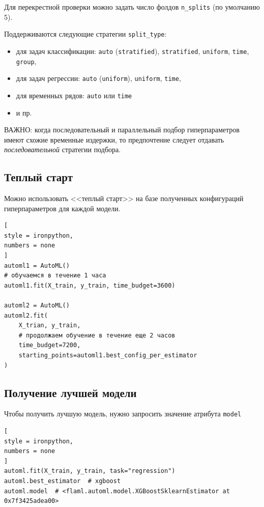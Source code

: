 \documentclass[%
	11pt,
	a4paper,
	utf8,
		]{article}
\begin{document}
Для перекрестной проверки можно задать число фолдов \verb|n_splits| (по умолчанию 5).

Поддерживаются следующие стратегии \verb|split_type|:
\begin{itemize}
	\item для задач классификации: \verb|auto| (\verb|stratified|), \verb|stratified|, \verb|uniform|, \verb|time|, \verb|group|,
	
	\item для задач регрессии: \verb|auto| (\verb|uniform|), \verb|uniform|, \verb|time|,
	
	\item для временных рядов: \verb|auto| или \verb|time|
	
	\item и пр.
\end{itemize}

ВАЖНО: когда последовательный и параллельный подбор гиперпараметров имеют схожие временные издержки, то предпочтение следует отдавать \emph{последовательной} стратегии подбора.

\subsection{Теплый старт}

Можно использовать <<теплый старт>> на базе полученных конфигураций гиперпараметров для каждой модели. 
\begin{lstlisting}[
style = ironpython,
numbers = none
]
automl1 = AutoML()
# обучаемся в течение 1 часа
automl1.fit(X_train, y_train, time_budget=3600)

automl2 = AutoML()
automl2.fit(
    X_trian, y_train,
    # продолжаем обучение в течение еще 2 часов
    time_budget=7200,
    starting_points=automl1.best_config_per_estimator
)
\end{lstlisting}

\subsection{Получение лучшей модели}

Чтобы получить лучшую модель, нужно запросить значение атрибута \verb|model|
\begin{lstlisting}[
style = ironpython,
numbers = none
]
automl.fit(X_train, y_train, task="regression")
automl.best_estimator  # xgboost
automl.model  # <flaml.automl.model.XGBoostSklearnEstimator at 0x7f3425adea00>
\end{lstlisting}
\end{document}
